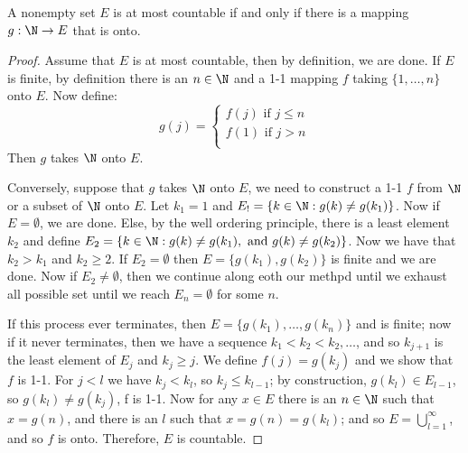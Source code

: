 \begin{lemma}
  A nonempty set $E$ is at most countable if and only if there is a mapping $g:\N \rightarrow E$ that is onto.
\end{lemma}
\begin{proof}
  Assume that $E$ is at most countable, then by definition, we are done. If $E$ is finite, by definition there is an 
  $n \in \N$ and a 1-1 mapping $f$ taking $\{1, \dots, n\}$ onto $E$. Now define:
  \begin{equation*}
    g(j)=\begin{cases}
      f(j) \text{ if } j \leq n \\
      f(1) \text{ if } j>n \\
  \end{cases}
  \end{equation*}
Then $g$ takes $\N$ onto $E$.

Conversely, suppose that $g$ takes $\N$ onto $E$, we need to construct a 1-1 $f$ from $\N$ or a subset of $\N$ onto $E$. 
Let $k_1=1$ and $E_!=\{k \in \N: g(k) \neq g(k_1)\}$. Now if $E=\emptyset$, we are done. Else, by the well ordering 
principle, there is a least element $k_2$ and define $E_2=\{k \in \N: g(k) \neq g(k_1), \text{ and } g(k) \neq g(k_2)\}$. 
Now we have that $k_2>k_1$ and $k_2 \geq 2$. If $E_2=\emptyset$ then $E=\{g(k_1),g(k_2)\}$ is finite and we are done. 
Now if $E_2 \neq \emptyset$, then we continue along eoth our methpd until we exhaust all possible set until we reach 
$E_n=\emptyset$ for some $n$.

If this process ever terminates, then $E=\{g(k_1), \dots, g(k_n)\}$ and is finite; now if it never terminates, then we have 
a sequence $k_1<k_2<k_2,\dots$, and so $k_{j+1}$ is the least element of $E_j$ and $k_j \geq j$. We define $f(j)=g(k_j)$ and 
we show that $f$ is 1-1. For $j<l$ we have $k_j<k_l$, so $k_j \leq k_{l-1}$; by  construction, $g(k_l) \in E_{l-1}$, 
so $g(k_l) \neq g(k_j)$, f is 1-1. Now for any $x \in E$ there is an $n \in \N$ such that $x=g(n)$, and there is an $l$ 
such that $x=g(n)=g(k_l)$; and so $E=\bigcup_{l=1}^{\infty}$, and so $f$ is onto. Therefore, $E$ is countable.
\end{proof}

